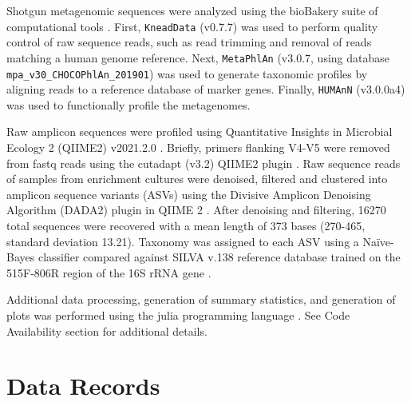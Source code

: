 \documentclass[fleqn,10pt]{wlscirep}
\begin{document}
Shotgun metagenomic sequences were analyzed using the bioBakery suite of computational tools \cite{McIver2018-yc}.
First, \verb|KneadData| (v0.7.7) was used to perform quality control of raw sequence reads,
such as read trimming and removal of reads matching a human genome reference.
Next, \verb|MetaPhlAn| (v3.0.7, using database \verb|mpa_v30_CHOCOPhlAn_201901|) was used to generate taxonomic profiles
by aligning reads to a reference database of marker genes.
Finally, \verb|HUMAnN| (v3.0.0a4) was used to functionally profile the metagenomes.

Raw amplicon sequences were profiled using Quantitative Insights in Microbial Ecology 2 (QIIME2) v2021.2.0 \cite{Bolyen2019-qq}.
Briefly, primers flanking V4-V5 were removed from fastq reads using the cutadapt (v3.2) QIIME2 plugin \cite{Martin2011-zv}.
Raw sequence reads of samples from enrichment cultures were denoised, filtered and clustered into amplicon sequence variants (ASVs) using the Divisive Amplicon Denoising Algorithm (DADA2) plugin in QIIME 2 \cite{Callahan2016-ol}.
After denoising and filtering, 16270 total sequences were recovered with a mean length of 373 bases (270-465, standard deviation 13.21).
Taxonomy was assigned to each ASV using a Naïve-Bayes classifier compared against SILVA v.138 reference database \cite{Yilmaz2013-rj,Quast2013-hc}
trained on the 515F-806R region of the 16S rRNA gene \cite{Bokulich2018-dv}.

Additional data processing, generation of summary statistics, 
and generation of plots was performed using the julia programming language \cite{Bezanson2017-ud}.
See Code Availability section for additional details.

\section*{Data Records}

\end{document}
